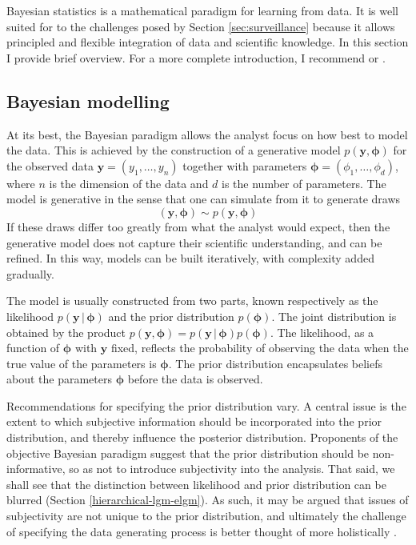 \documentclass[a4paper, nobind]{templates/ociamthesis}
\newcommand{\y}{\mathbf{y}}
\newcommand{\bphi}{\bm{\phi}}
\begin{document}
Bayesian statistics is a mathematical paradigm for learning from data.
It is well suited for to the challenges posed by Section \ref{sec:surveillance} because it allows principled and flexible integration of data and scientific knowledge.
In this section I provide brief overview.
For a more complete introduction, I recommend \textcite{mcelreath2020statistical} or \textcite{gelman2013bayesian}.

\hypertarget{bayesian-modelling}{%
\subsection{Bayesian modelling}\label{bayesian-modelling}}

At its best, the Bayesian paradigm allows the analyst focus on how best to model the data.
This is achieved by the construction of a generative model \(p(\y, \bphi)\) for the observed data \(\y = (y_1, \ldots, y_n)\) together with parameters \(\bphi = (\phi_1, \ldots, \phi_d)\), where \(n\) is the dimension of the data and \(d\) is the number of parameters.
The model is generative in the sense that one can simulate from it to generate draws
\begin{equation}
(\y, \bphi) \sim p(\y, \bphi)
\end{equation}
If these draws differ too greatly from what the analyst would expect, then the generative model does not capture their scientific understanding, and can be refined.
In this way, models can be built iteratively, with complexity added gradually.

The model is usually constructed from two parts, known respectively as the likelihood \(p(\y \, | \, \bphi)\) and the prior distribution \(p(\bphi)\).
The joint distribution is obtained by the product \(p(\y, \bphi) = p(\y \, | \, \bphi) p(\bphi)\).
The likelihood, as a function of \(\bphi\) with \(\y\) fixed, reflects the probability of observing the data when the true value of the parameters is \(\bphi\).
The prior distribution encapsulates beliefs about the parameters \(\bphi\) before the data is observed.

Recommendations for specifying the prior distribution vary.
A central issue is the extent to which subjective information should be incorporated into the prior distribution, and thereby influence the posterior distribution.
Proponents of the objective Bayesian paradigm suggest that the prior distribution should be non-informative, so as not to introduce subjectivity into the analysis.
That said, we shall see that the distinction between likelihood and prior distribution can be blurred (Section \ref{hierarchical-lgm-elgm}).
As such, it may be argued that issues of subjectivity are not unique to the prior distribution, and ultimately the challenge of specifying the data generating process is better thought of more holistically \autocite{gelman2017prior}.
\end{document}
